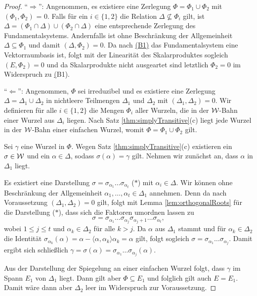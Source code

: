 \begin{proof}
  ``$\Rightarrow$'':
  Angenommen, es existiere eine Zerlegung $\Phi = \Phi_1 \cup \Phi_2$ mit $(\Phi_1, \Phi_2)$ = 0.
  Falls für ein $i \in \{1,2\}$ die Relation $\Delta \not\subseteq \Phi_i$ gilt, ist $\Delta = (\Phi_1 \cap \Delta) \cup (\Phi_2 \cap \Delta)$ eine entsprechende Zerlegung des Fundamentalsystems.
  Andernfalls ist ohne Beschränkung der Allgemeinheit $\Delta \subseteq \Phi_1$ und damit $(\Delta, \Phi_2) = 0$.
  Da nach \hyperref[it:B1]{(B1)} das Fundamentalsystem eine Vektorraumbasis ist, folgt mit der Linearität des Skalarproduktes sogleich $(E, \Phi_2) = 0$ und da Skalarprodukte nicht ausgeartet sind letztlich $\Phi_2 = {0}$ im Widerspruch zu \hyperref[it:B1](B1).

  ``$\Leftarrow$'':
  Angenommen, $\Phi$ sei irreduzibel und es existiere eine Zerlegung $\Delta = \Delta_1 \cup \Delta_2$ in nichtleere Teilmengen $\Delta_1$ und $\Delta_2$ mit $(\Delta_1, \Delta_2) = 0$.
  Wir definieren für alle $i \in \{1,2\}$ die Mengen $\Phi_i$ aller Wurzeln, die in der $\mathcal{W}$\hyp{}Bahn einer Wurzel aus $\Delta_i$ liegen. 
  Nach Satz \ref{thm:simplyTransitive}(c) liegt jede Wurzel in der $\mathcal{W}$\hyp{}Bahn einer einfachen Wurzel, womit $\Phi = \Phi_1 \cup \Phi_2$ gilt.

  Sei $\gamma$ eine Wurzel in $\Phi$.
  Wegen Satz \ref{thm:simplyTransitive}(c) existieren ein $\sigma \in \mathcal{W}$ und ein $\alpha \in \Delta$, sodass $\sigma(\alpha) = \gamma$ gilt.
  Nehmen wir zunächst an, dass $\alpha$ in $\Delta_1$ liegt.

  Es existiert eine Darstellung $\sigma = \sigma_{\alpha_1} \dots \sigma_{\alpha_t}$ ($\ast$) mit $\alpha_i \in \Delta$.
  Wir können ohne Beschränkung der Allgemeinheit $\alpha_1,\dots,\alpha_t \in \Delta_1$ annehmen.
  Denn da nach Voraussetzung $(\Delta_1, \Delta_2) = 0$ gilt, folgt mit Lemma \ref{lem:orthogonalRoots} für die Darstellung ($\ast$), dass sich die Faktoren umordnen lassen zu
  \begin{displaymath}
    \sigma = \sigma_{\alpha_1} \dots \sigma_{\alpha_j} \sigma_{\alpha_j+1} \dots \sigma_{\alpha_t},
  \end{displaymath}
  wobei $1 \leq j \leq t$ und $\alpha_k \in \Delta_2$ für alle $k > j$.
  Da $\alpha$ aus $\Delta_1$ stammt und für $\alpha_k \in \Delta_2$ die Identität $\sigma_{\alpha_k}(\alpha) = \alpha - \langle \alpha, \alpha_k \rangle \alpha_k = \alpha$ gilt, folgt sogleich $\sigma = \sigma_{\alpha_1} \dots \sigma_{\alpha_j}$. 
  Damit ergibt sich schließlich $\gamma = \sigma(\alpha) = \sigma_{\alpha_1} \dots \sigma_{\alpha_j}(\alpha)$.

  Aus der Darstellung der Spiegelung an einer einfachen Wurzel folgt, dass $\gamma$ im Spann $E_1$ von $\Delta_1$ liegt.
  Dann gilt aber $\Phi \subseteq E_1$ und folglich gilt auch $E = E_1$.
  Damit wäre dann aber $\Delta_2$ leer im Widerspruch zur Voraussetzung.
\end{proof}

